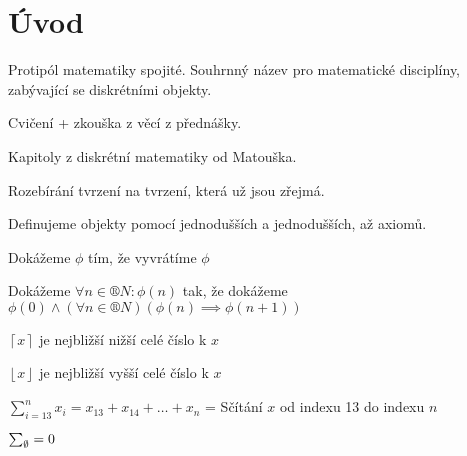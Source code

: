\documentclass[12pt]{article}					%
\begin{document}
\section{Úvod}
    \begin{poznamka}
        Protipól matematiky spojité. Souhrnný název pro matematické disciplíny, zabývající se diskrétními objekty.
    \end{poznamka}

    \begin{poznamka}[Co je potřeba]
        Cvičení + zkouška z věcí z přednášky.
    \end{poznamka}

    \begin{poznamka}[literatura]
        Kapitoly z diskrétní matematiky od Matouška.
    \end{poznamka}

    \begin{definice}
        Rozebírání tvrzení na tvrzení, která už jsou zřejmá.
    \end{definice}

    \begin{definice}
        Definujeme objekty pomocí jednodušších a jednodušších, až axiomů.
    \end{definice}
    
    \begin{definice}
        Dokážeme $\phi$ tím, že vyvrátíme $\phi$
    \end{definice}

    \begin{definice}
            Dokážeme $\forall n \in ®N: \phi(n)$ tak, že dokážeme $\phi(0)\land(\forall n \in ®N)(\phi(n)\implies\phi(n+1))$
    \end{definice}

    \begin{definice}
        $\left\lceil x\right\rceil$ je nejbližší nižší celé číslo k $x$

        $\left\lfloor x\right\rfloor$ je nejbližší vyšší celé číslo k $x$
    \end{definice}

    \begin{definice}
        $\sum_{i=13}^n x_i = x_{13} + x_{14} + … + x_n$ = Sčítání $x$ od indexu 13 do indexu $n$

        $\sum_\emptyset = 0$
    \end{definice}
\end{document}
